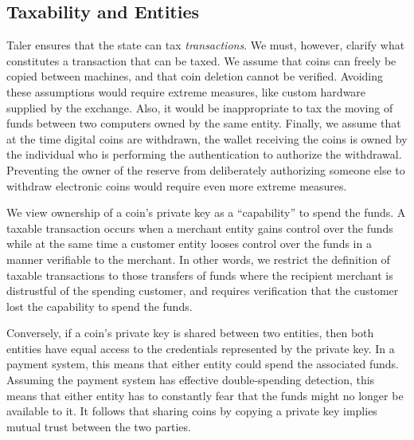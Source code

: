 \documentclass{llncs}
\begin{document}
\subsection{Taxability and Entities}

Taler ensures that the state can tax {\em transactions}.  We must,
however, clarify what constitutes a transaction that can be taxed.
We assume that coins can freely be
copied between machines, and that coin deletion cannot be verified.
Avoiding these assumptions would require extreme measures, like custom
hardware supplied by the exchange.  Also, it would be inappropriate to
tax the moving of funds between two computers owned by the same
entity.  Finally, we assume that at the time digital coins are
withdrawn, the wallet receiving the coins is owned by the individual
who is performing the authentication to authorize the withdrawal.
Preventing the owner of the reserve from deliberately authorizing
someone else to withdraw electronic coins would require even more
extreme measures.

We view ownership of a coin's private key as a ``capability'' to spend
the funds.  A taxable transaction occurs when a merchant entity gains
control over the funds while at the same time a customer entity looses
control over the funds in a manner verifiable to the merchant.  In
other words, we restrict the definition of taxable transactions to
those transfers of funds where the recipient merchant is distrustful
of the spending customer, and requires verification that the customer
lost the capability to spend the funds.

Conversely, if a coin's private key is shared between two entities,
then both entities have equal access to the credentials represented by
the private key.  In a payment system, this means that either entity
could spend the associated funds.  Assuming the payment system has
effective double-spending detection, this means that either entity has
to constantly fear that the funds might no longer be available to it.
It follows that sharing coins by copying a private key implies mutual
trust between the two parties.
\end{document}
